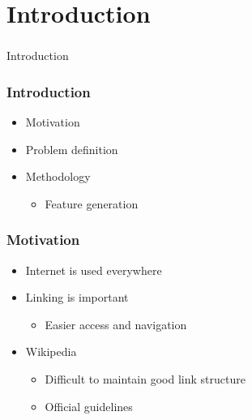 \section[Introduction]{Introduction}

\begin{frame}
  \frametitle{}
  \begin{center}
    {\Huge Introduction}
  \end{center}
\end{frame}

\begin{frame}
    \frametitle{Introduction}
    \centering
    \begin{itemize}
      \item Motivation
      \item Problem definition
      \item Methodology
        \begin{itemize}
          \item Feature generation
        \end{itemize}
    \end{itemize}
\end{frame}

\begin{frame}
    \frametitle{Motivation}
    \centering
    \begin{itemize}
      \item Internet is used everywhere
      \item Linking is important
        \begin{itemize}
          \item Easier access and navigation
        \end{itemize}
      \item Wikipedia
        \begin{itemize}
           \item Difficult to maintain good link structure
           \item Official guidelines
         \end{itemize}
    \end{itemize}
\end{frame}

